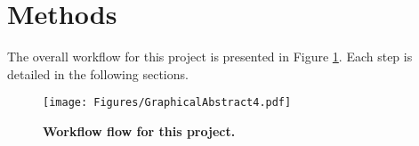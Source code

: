 \documentclass[final,3p,times,authoryear]{elsarticle}
\begin{document}




















\section{Methods}\label{sec:methods}

The overall workflow for this project is presented in Figure \ref{fig:process}. Each step is detailed in the following sections.


\begin{figure}[ht]
\centering
\texttt{[image: Figures/GraphicalAbstract4.pdf]}
\caption{\bf Workflow flow for this project.}
 \label{fig:process}
\end{figure} 

\end{document}
